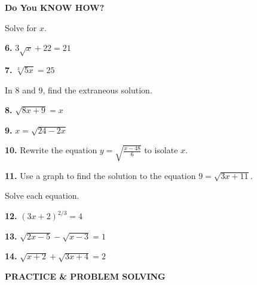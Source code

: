 \documentclass{article}
\newenvironment{practice}[2]{\noindent\textbf{#1.}}{}
\begin{document}
\begin{minipage}[t]{0.5\textwidth}
\textbf{\large Do You KNOW HOW?}

Solve for $x$.

\begin{practice}{6}{}
$3\sqrt{x} + 22 = 21$
\end{practice}

\begin{practice}{7}{}
$\sqrt[3]{5x} = 25$
\end{practice}

In 8 and 9, find the extraneous solution.

\begin{practice}{8}{}
$\sqrt{8x + 9} = x$
\end{practice}

\begin{practice}{9}{}
$x = \sqrt{24 - 2x}$
\end{practice}

\begin{practice}{10}{}
Rewrite the equation $y = \sqrt{\frac{x - 48}{6}}$ to isolate $x$.
\end{practice}

\begin{practice}{11}{}
Use a graph to find the solution to the equation $9 = \sqrt{3x + 11}$.
\end{practice}

Solve each equation.

\begin{practice}{12}{}
$(3x + 2)^{2/3} = 4$
\end{practice}

\begin{practice}{13}{}
$\sqrt{2x - 5} - \sqrt{x - 3} = 1$
\end{practice}

\begin{practice}{14}{}
$\sqrt{x + 2} + \sqrt{3x + 4} = 2$
\end{practice}
\end{minipage}

\clearpage

\textbf{\Large PRACTICE \& PROBLEM SOLVING}
\end{document}

